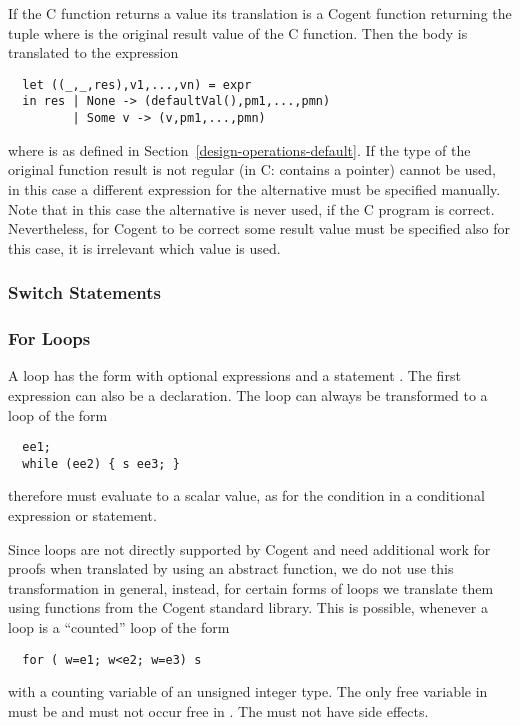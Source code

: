 If the C function returns a value its translation is a Cogent function returning the tuple 
where  is the original result value of the C function. Then the body is translated to the expression
\begin{verbatim}
  let ((_,_,res),v1,...,vn) = expr
  in res | None -> (defaultVal(),pm1,...,pmn)
         | Some v -> (v,pm1,...,pmn)
\end{verbatim}
where  is as defined in Section~\ref{design-operations-default}. If the type of the original function
result  is not regular (in C: contains a pointer)  cannot be used, in this case a different
expression for the  alternative must be specified manually. Note that in this case the  alternative
is never used, if the C program is correct. Nevertheless, for Cogent to be correct some result value must be specified 
also for this case, it is irrelevant which value is used.

\subsubsection{Switch Statements}

\subsubsection{For Loops}

A  loop has the form  with optional expressions  and a statement . 
The first expression  can also be a declaration. The  loop can always be transformed to a 
loop of the form
\begin{verbatim}
  ee1;
  while (ee2) { s ee3; }
\end{verbatim}
therefore  must evaluate to a scalar value, as for the condition in a conditional expression or statement.

Since  loops are not directly supported by Cogent and need additional work for proofs when translated by using
an abstract function, we do not use this transformation in general, instead, for certain forms of  loops we
translate them using functions from the Cogent standard library. This is possible, whenever a  loop is a 
``counted'' loop of the form
\begin{verbatim}
  for ( w=e1; w<e2; w=e3) s
\end{verbatim}
with a counting variable  of an unsigned integer type. The only free variable in  must be  and
 must not occur free in . The  must not have side effects.

